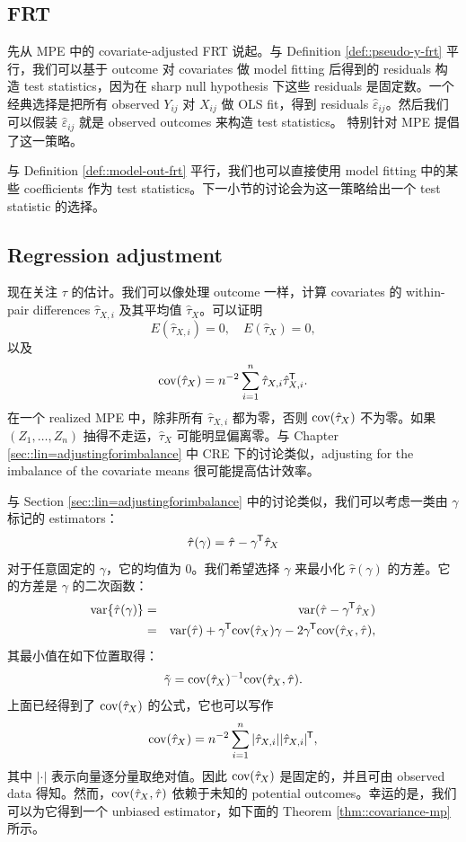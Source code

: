 \subsection{FRT}

 
先从 MPE 中的 covariate-adjusted FRT 说起。与 Definition \ref{def::pseudo-y-frt} 平行，我们可以基于 outcome 对 covariates 做 model fitting 后得到的 residuals 构造 test statistics，因为在 sharp null hypothesis 下这些 residuals 是固定数。一个经典选择是把所有 observed $Y_{ij}$ 对 $X_{ij}$ 做 OLS fit，得到 residuals $\hat \varepsilon_{ij}$。然后我们可以假装 $\hat \varepsilon_{ij}$ 就是 observed outcomes 来构造 test statistics。\citet{rosenbaum2002covariance} 特别针对 MPE 提倡了这一策略。


与 Definition \ref{def::model-out-frt} 平行，我们也可以直接使用 model fitting 中的某些 coefficients 作为 test statistics。下一小节的讨论会为这一策略给出一个 test statistic 的选择。



\subsection{Regression adjustment}


现在关注 $\tau$ 的估计。我们可以像处理 outcome 一样，计算 covariates 的 within-pair differences $\hat{\tau}_{X,i} $ 及其平均值 $\hat{\tau}_X $。可以证明
$$
 E(\hat{\tau}_{X,i}   ) = 0,\quad 
 E(\hat{\tau}_X ) = 0,
 $$
以及
$$
\textup{cov}(\hat{\tau}_X   ) =n^{-2} \sum_{i=1}^n \hat{\tau}_{X,i}   \hat{\tau}_{X,i}  ^{\mkern-1.5mu\mathsf{T}} .
$$
在一个 realized MPE 中，除非所有 $\hat{\tau}_{X,i}  $ 都为零，否则 $\textup{cov}(\hat{\tau}_X   ) $ 不为零。如果 $(Z_1,\ldots, Z_n)$ 抽得不走运，$\hat{\tau}_X $ 可能明显偏离零。与 Chapter \ref{sec::lin=adjustingforimbalance} 中 CRE 下的讨论类似，adjusting for the imbalance of the covariate means 很可能提高估计效率。

与 Section \ref{sec::lin=adjustingforimbalance} 中的讨论类似，我们可以考虑一类由 $\gamma$ 标记的 estimators：
$$
\hat{\tau}(\gamma) = \hat{\tau} - \gamma^{\mkern-1.5mu\mathsf{T}} \hat{\tau}_X 
$$
对于任意固定的 $\gamma$，它的均值为 $0$。我们希望选择 $\gamma$ 来最小化 $\hat{\tau}(\gamma)$ 的方差。它的方差是 $\gamma$ 的二次函数：
\begin{eqnarray*}
\textup{var}\{ \hat{\tau}(\gamma) \} &=&   \textup{var}(\hat{\tau} - \gamma^{\mkern-1.5mu\mathsf{T}} \hat{\tau}_X ) \\
&=&  \textup{var}(\hat{\tau}  ) + \gamma^{\mkern-1.5mu\mathsf{T}} \textup{cov}(\hat{\tau}_X   ) \gamma - 2\gamma^{\mkern-1.5mu\mathsf{T}} \textup{cov}( \hat{\tau}_X ,  \hat{\tau}  ),
\end{eqnarray*}
其最小值在如下位置取得：
$$
\tilde{\gamma} = \textup{cov}(\hat{\tau}_X   )^{-1}  \textup{cov}( \hat{\tau}_X ,  \hat{\tau}  ).
$$
上面已经得到了 $\textup{cov}(\hat{\tau}_X   ) $ 的公式，它也可以写作
$$
\textup{cov}(\hat{\tau}_X   ) = n^{-2} \sum_{i=1}^n |  \hat{\tau}_{X,i}  |  |\hat{\tau}_{X,i}  | ^{\mkern-1.5mu\mathsf{T}},
$$
其中 $| \cdot | $ 表示向量逐分量取绝对值。因此 $\textup{cov}(\hat{\tau}_X   ) $ 是固定的，并且可由 observed data 得知。然而，$\textup{cov}( \hat{\tau}_X ,  \hat{\tau}  )$ 依赖于未知的 potential outcomes。幸运的是，我们可以为它得到一个 unbiased estimator，如下面的 Theorem \ref{thm::covariance-mp} 所示。

